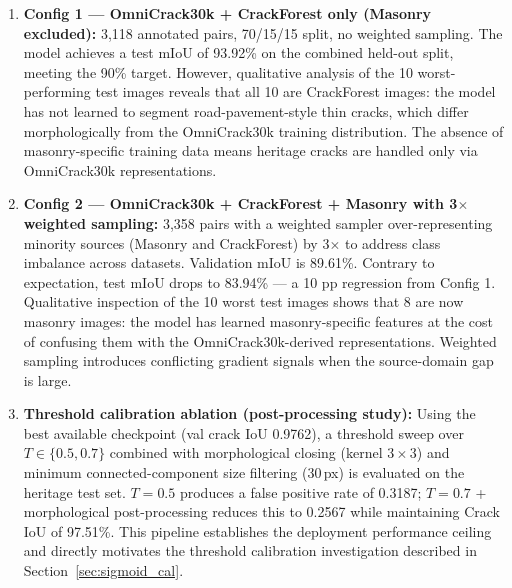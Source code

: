 \documentclass[12pt,a4paper]{article}
\begin{document}
\begin{enumerate}[leftmargin=1.5cm]

\item \textbf{Config 1 --- OmniCrack30k + CrackForest only (Masonry excluded):}
3,118 annotated pairs, 70/15/15 split, no weighted sampling. The model achieves a test mIoU of 93.92\% on the combined held-out split, meeting the 90\% target. However, qualitative analysis of the 10 worst-performing test images reveals that all 10 are CrackForest images: the model has not learned to segment road-pavement-style thin cracks, which differ morphologically from the OmniCrack30k training distribution. The absence of masonry-specific training data means heritage cracks are handled only via OmniCrack30k representations.

\item \textbf{Config 2 --- OmniCrack30k + CrackForest + Masonry with 3$\times$ weighted sampling:}
3,358 pairs with a weighted sampler over-representing minority sources (Masonry and CrackForest) by 3$\times$ to address class imbalance across datasets. Validation mIoU is 89.61\%. Contrary to expectation, test mIoU drops to 83.94\% --- a 10 pp regression from Config 1. Qualitative inspection of the 10 worst test images shows that 8 are now masonry images: the model has learned masonry-specific features at the cost of confusing them with the OmniCrack30k-derived representations. Weighted sampling introduces conflicting gradient signals when the source-domain gap is large.

\item \textbf{Threshold calibration ablation (post-processing study):}
Using the best available checkpoint (val crack IoU 0.9762), a threshold sweep over $T \in \{0.5, 0.7\}$ combined with morphological closing (kernel $3\times3$) and minimum connected-component size filtering (30\,px) is evaluated on the heritage test set. $T=0.5$ produces a false positive rate of 0.3187; $T=0.7$ + morphological post-processing reduces this to 0.2567 while maintaining Crack IoU of 97.51\%. This pipeline establishes the deployment performance ceiling and directly motivates the threshold calibration investigation described in Section~\ref{sec:sigmoid_cal}.

\end{enumerate}
\end{document}
